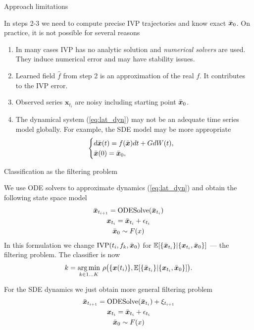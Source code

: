 \documentclass[10pt]{beamer}
\newcommand{\bx}{\ensuremath{\boldsymbol{x}}}
\newcommand{\bbx}{\ensuremath\bar{{\boldsymbol{x}}}}
\begin{document}
	\begin{frame}{Approach limitations}
		
		In steps 2-3 we need to compute precise IVP trajectories and know exact $\bbx_0$. On practice, it is not possible for several reasons
		
		\begin{enumerate}
			\item In many cases IVP has no analytic solution and \emph{numerical solvers} are used. They induce numerical error and may have stability issues.
			\item Learned field $\hat{f}$ from step 2 is an approximation of the real $f$. It contributes to the IVP error.
			\item Observed series $\bx_{t_i}$ are noisy including starting point $\bbx_0$.
			\item The dynamical system (\ref{eq:lat_dyn}) may not be an adequate time series model globally. For example, the SDE model may be more appropriate
			\begin{equation}\label{eq:series_sde_dyn}
				\begin{cases}
					d\bbx(t) = f(\bbx)dt + G dW(t), \\
					\bbx(0) = \bbx_0,
				\end{cases}
			\end{equation}
		\end{enumerate}
		
	\end{frame}
	
	\begin{frame}{Classification as the filtering problem}
		
		We use ODE solvers to approximate dynamics (\ref{eq:lat_dyn}) and obtain the following state space model
		\begin{gather*}
			\bbx_{t_{i+1}} = \text{ODESolve}(\bbx_{t_i}) \\
			\bx_{t_i} = \bbx_{t_i} + \epsilon_{t_i} \\
			\bbx_0 \sim F(x)
		\end{gather*}
		In this formulation we change $\text{IVP}(t_i, f_k, \bbx_0)$ for $\mathbb{E}[ \{ \bbx_{t_i} \} | \{ \bx_{t_i}, \bbx_0 \}]$ --- the filtering problem. The classifier is now
		\begin{equation*}
			k = \underset{k \in 1 \ldots K}{\arg\min} \  \rho \big( \{\bx(t_i)\}, \mathbb{E}[ \{ \bbx_{t_i} \} | \{ \bx_{t_i}, \bbx_0 \}] \big).
		\end{equation*}
		
		For the SDE dynamics we just obtain more general filtering problem
		\begin{gather*}
			\bbx_{t_{i+1}} = \text{ODESolve}(\bbx_{t_i}) + \xi_{t_{i+1}} \\
			\bx_{t_i} = \bbx_{t_i} + \epsilon_{t_i} \\
			\bbx_0 \sim F(x)
		\end{gather*}
		
	\end{frame}
	
\end{document}
